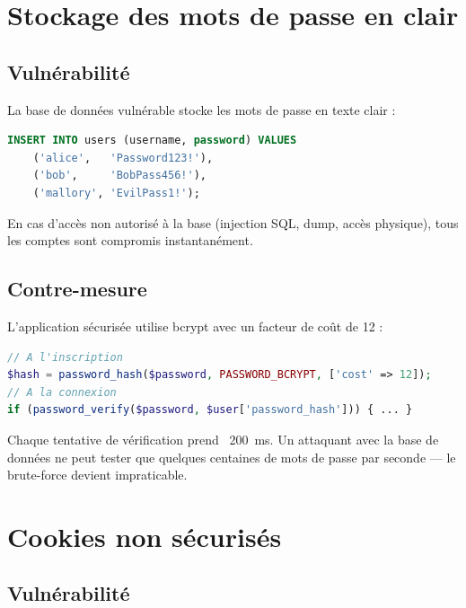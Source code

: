 \documentclass[12pt,a4paper]{report}
\begin{document}
\section{Stockage des mots de passe en clair}

\subsection{Vulnérabilité}

La base de données vulnérable stocke les mots de passe en texte clair :

\begin{lstlisting}[language=SQL, caption={Schéma vulnérable — mots de passe en clair}]
INSERT INTO users (username, password) VALUES
    ('alice',   'Password123!'),
    ('bob',     'BobPass456!'),
    ('mallory', 'EvilPass1!');
\end{lstlisting}

En cas d'accès non autorisé à la base (injection SQL, dump, accès physique), tous les comptes sont compromis instantanément.

\subsection{Contre-mesure}

\begin{securebox}
L'application sécurisée utilise bcrypt avec un facteur de coût de 12 :
\begin{lstlisting}[language=PHP, caption={Hachage bcrypt}]
// A l'inscription
$hash = password_hash($password, PASSWORD_BCRYPT, ['cost' => 12]);
// A la connexion
if (password_verify($password, $user['password_hash'])) { ... }
\end{lstlisting}
Chaque tentative de vérification prend ~200~ms. Un attaquant avec la base de données ne peut tester que quelques centaines de mots de passe par seconde — le brute-force devient impraticable.
\end{securebox}

\section{Cookies non sécurisés}

\subsection{Vulnérabilité}
\end{document}
